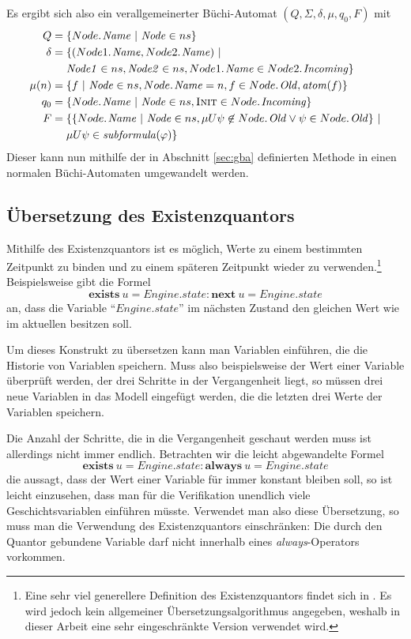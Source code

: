 Es ergibt sich also ein verallgemeinerter Büchi-Automat $(Q,\Sigma,\delta,\mu,q_0,F)$ mit
\begin{align*}
  Q = {}& \{ \attrib{Node}{Name}\ |\ \id{Node}\in ns \}\\
  \delta = {} & \{ (\attrib{Node1}{Name},\attrib{Node2}{Name})\ |\\
          & \id{Node1}\in ns,\id{Node2}\in ns, \attrib{Node1}{Name}\in \attrib{Node2}{Incoming}\}\\
  \mu(n) = {} & \{ f\ |\ \id{Node}\in ns, \attrib{Node}{Name} = n, f\in\attrib{Node}{Old}, \id{atom}(f) \}\\
  q_0 = {} & \{ \attrib{Node}{Name}\ |\ \id{Node}\in ns, \const{Init}\in\attrib{Node}{Incoming} \}\\
  F = {} & \{ \{ \attrib{Node}{Name}\ |\ \id{Node}\in ns, \mu U\psi \not\in \attrib{Node}{Old}\lor \psi\in\attrib{Node}{Old} \}\ |\\
     & \mu U\psi\in\id{subformula}(\varphi) \}
\end{align*}
Dieser kann nun mithilfe der in Abschnitt \ref{sec:gba} definierten Methode in einen normalen Büchi-Automaten umgewandelt werden.

\subsection{Übersetzung des Existenzquantors}
Mithilfe des Existenzquantors ist es möglich, Werte zu einem bestimmten Zeitpunkt zu binden und zu einem späteren Zeitpunkt wieder zu verwenden.\footnote{Eine sehr viel generellere Definition des Existenzquantors findet sich in \cite{exists_quantor}.
  Es wird jedoch kein allgemeiner Übersetzungsalgorithmus angegeben, weshalb in dieser Arbeit eine sehr eingeschränkte Version verwendet wird.
}
Beispielsweise gibt die Formel
\[ \textbf{exists}\ u = \mathit{Engine}.\mathit{state} : \textbf{next}\ u = \mathit{Engine}.\mathit{state} \]
an, dass die Variable "`$\mathit{Engine}.\mathit{state}$"' im nächsten Zustand den gleichen Wert wie im aktuellen besitzen soll.

Um dieses Konstrukt zu übersetzen kann man Variablen einführen, die die Historie von Variablen speichern.
Muss also beispielsweise der Wert einer Variable überprüft werden, der drei Schritte in der Vergangenheit liegt, so müssen drei neue Variablen in das Modell eingefügt werden, die die letzten drei Werte der Variablen speichern.

Die Anzahl der Schritte, die in die Vergangenheit geschaut werden muss ist allerdings nicht immer endlich.
Betrachten wir die leicht abgewandelte Formel
\[ \textbf{exists}\ u = \mathit{Engine}.\mathit{state} : \textbf{always}\ u = \mathit{Engine}.\mathit{state} \]
die aussagt, dass der Wert einer Variable für immer konstant bleiben soll, so ist leicht einzusehen, dass man für die Verifikation unendlich viele Geschichtsvariablen einführen müsste.
Verwendet man also diese Übersetzung, so muss man die Verwendung des Existenzquantors einschränken:
Die durch den Quantor gebundene Variable darf nicht innerhalb eines \emph{always}-Operators vorkommen.

